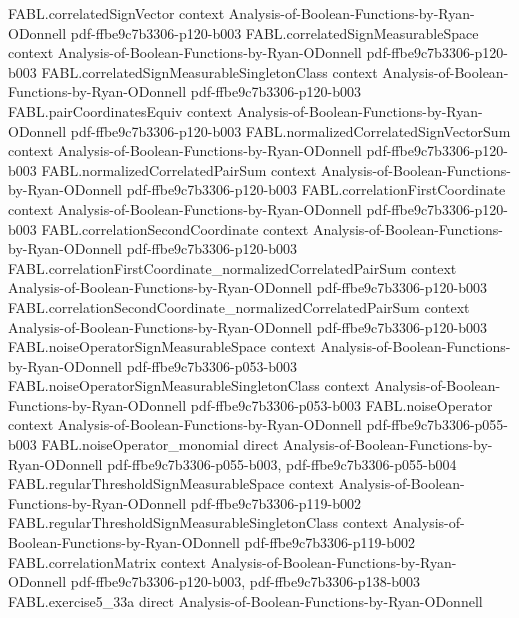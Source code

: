 \begin{theorem}
\proofstep
  {FABL.correlatedSignVector}
  {context}
  {Analysis-of-Boolean-Functions-by-Ryan-ODonnell}
  {pdf-ffbe9c7b3306-p120-b003}
\proofstep
  {FABL.correlatedSignMeasurableSpace}
  {context}
  {Analysis-of-Boolean-Functions-by-Ryan-ODonnell}
  {pdf-ffbe9c7b3306-p120-b003}
\proofstep
  {FABL.correlatedSignMeasurableSingletonClass}
  {context}
  {Analysis-of-Boolean-Functions-by-Ryan-ODonnell}
  {pdf-ffbe9c7b3306-p120-b003}
\proofstep
  {FABL.pairCoordinatesEquiv}
  {context}
  {Analysis-of-Boolean-Functions-by-Ryan-ODonnell}
  {pdf-ffbe9c7b3306-p120-b003}
\proofstep
  {FABL.normalizedCorrelatedSignVectorSum}
  {context}
  {Analysis-of-Boolean-Functions-by-Ryan-ODonnell}
  {pdf-ffbe9c7b3306-p120-b003}
\proofstep
  {FABL.normalizedCorrelatedPairSum}
  {context}
  {Analysis-of-Boolean-Functions-by-Ryan-ODonnell}
  {pdf-ffbe9c7b3306-p120-b003}
\proofstep
  {FABL.correlationFirstCoordinate}
  {context}
  {Analysis-of-Boolean-Functions-by-Ryan-ODonnell}
  {pdf-ffbe9c7b3306-p120-b003}
\proofstep
  {FABL.correlationSecondCoordinate}
  {context}
  {Analysis-of-Boolean-Functions-by-Ryan-ODonnell}
  {pdf-ffbe9c7b3306-p120-b003}
\proofstep
  {FABL.correlationFirstCoordinate_normalizedCorrelatedPairSum}
  {context}
  {Analysis-of-Boolean-Functions-by-Ryan-ODonnell}
  {pdf-ffbe9c7b3306-p120-b003}
\proofstep
  {FABL.correlationSecondCoordinate_normalizedCorrelatedPairSum}
  {context}
  {Analysis-of-Boolean-Functions-by-Ryan-ODonnell}
  {pdf-ffbe9c7b3306-p120-b003}
\proofstep
  {FABL.noiseOperatorSignMeasurableSpace}
  {context}
  {Analysis-of-Boolean-Functions-by-Ryan-ODonnell}
  {pdf-ffbe9c7b3306-p053-b003}
\proofstep
  {FABL.noiseOperatorSignMeasurableSingletonClass}
  {context}
  {Analysis-of-Boolean-Functions-by-Ryan-ODonnell}
  {pdf-ffbe9c7b3306-p053-b003}
\proofstep
  {FABL.noiseOperator}
  {context}
  {Analysis-of-Boolean-Functions-by-Ryan-ODonnell}
  {pdf-ffbe9c7b3306-p055-b003}
\proofstep
  {FABL.noiseOperator_monomial}
  {direct}
  {Analysis-of-Boolean-Functions-by-Ryan-ODonnell}
  {pdf-ffbe9c7b3306-p055-b003,
    pdf-ffbe9c7b3306-p055-b004}
\proofstep
  {FABL.regularThresholdSignMeasurableSpace}
  {context}
  {Analysis-of-Boolean-Functions-by-Ryan-ODonnell}
  {pdf-ffbe9c7b3306-p119-b002}
\proofstep
  {FABL.regularThresholdSignMeasurableSingletonClass}
  {context}
  {Analysis-of-Boolean-Functions-by-Ryan-ODonnell}
  {pdf-ffbe9c7b3306-p119-b002}
\proofstep
  {FABL.correlationMatrix}
  {context}
  {Analysis-of-Boolean-Functions-by-Ryan-ODonnell}
  {pdf-ffbe9c7b3306-p120-b003,
    pdf-ffbe9c7b3306-p138-b003}
\proofstep
  {FABL.exercise5_33a}
  {direct}
  {Analysis-of-Boolean-Functions-by-Ryan-ODonnell}

\end{theorem}
